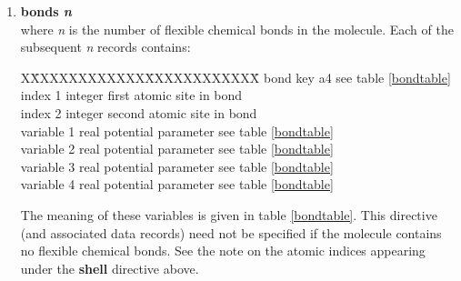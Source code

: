 \begin{enumerate}
\item{\bf bonds {\em n}}\\
where {\em n} is the number of flexible chemical bonds in the
molecule.  Each of the subsequent {\em n} records contains:
\begin{tabbing}
X\=XXXXXXXXXXXX\=XXXXXXXXXXXX\=\kill
\> bond key \> a4 \> see table \ref{bondtable}\\
\> index 1 \> integer \> first atomic site in bond\\
\> index 2 \> integer \> second atomic site in bond\\
\> variable 1 \> real \> potential parameter see table \ref{bondtable}\\
\> variable 2 \> real \> potential parameter see table \ref{bondtable}\\
\> variable 3 \> real \> potential parameter see table \ref{bondtable}\\
\> variable 4 \> real \> potential parameter see table \ref{bondtable}\\
\end{tabbing}
The meaning of these variables is given in table \ref{bondtable}.
This directive (and associated data records) need not be specified if
the molecule contains no flexible chemical bonds.
See the note on the atomic indices appearing under the {\bf shell}
directive above.


\end{enumerate}
